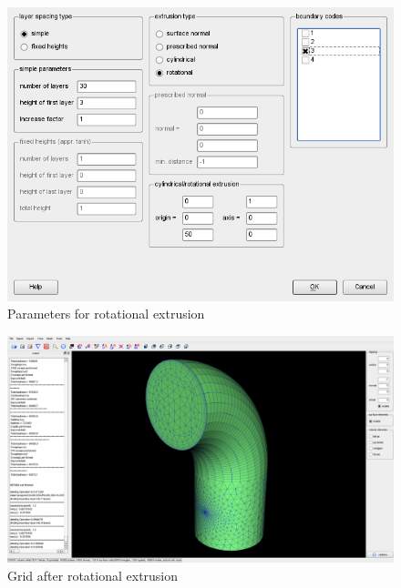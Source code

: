 \documentclass[10pt,a4paper,british]{book}
\begin{document}
\begin{figure}
  \begin{centering}
    \includegraphics[width=132mm]{figures/tutorials/T1/scr06}
    \par
  \end{centering}
  \caption{Parameters for rotational extrusion}
  \label{fig:T1_scr06}
\end{figure}
\begin{figure}
  \begin{centering}
    \includegraphics[width=14cm]{figures/tutorials/T1/scr07}
    \par
  \end{centering}
  \caption{Grid after rotational extrusion}
  \label{fig:T1_scr07}
\end{figure}
\end{document}
